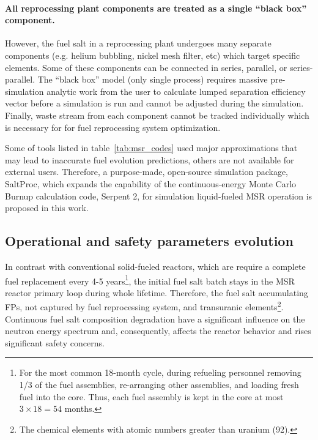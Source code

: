 \paragraph{All reprocessing plant components are treated as a single ``black 
box'' component.} However, the fuel salt in a reprocessing plant undergoes 
many separate components (e.g. helium bubbling, nickel mesh filter, etc) which 
target specific elements. Some of these components can be connected in series, 
parallel, or series-parallel. The ``black box'' model (only single process) 
requires massive pre-simulation analytic work from the user to calculate 
lumped separation efficiency vector before a simulation is run and cannot be 
adjusted during the simulation.	Finally, waste stream from each component 
cannot be tracked individually which is necessary for for fuel reprocessing 
system optimization.

Some of tools listed in table~\ref{tab:msr_codes} used major approximations 
that may lead to inaccurate fuel evolution predictions, others are not 
available for external users. Therefore, a purpose-made, open-source 
simulation package, SaltProc, which expands the capability of the 
continuous-energy Monte Carlo 
Burnup calculation code, Serpent 2, for simulation liquid-fueled \gls{MSR} 
operation is proposed in this work.

\subsection{Operational and safety parameters evolution}
In contrast with conventional solid-fueled reactors, which are require a 
complete fuel replacement every 4-5 years\footnote{For the most common 
18-month cycle, 
during refueling personnel removing 1/3 of the fuel assemblies, re-arranging 
other assemblies, and loading fresh fuel into the core. Thus, each fuel 
assembly is kept in the core at most $3\times 18=54$ months.}, the initial 
fuel salt batch stays in the \gls{MSR} reactor primary loop during whole 
lifetime. Therefore, the fuel salt accumulating \glspl{FP}, not captured 
by fuel  reprocessing system, and transuranic elements\footnote{The chemical 
elements with atomic numbers greater than uranium (92).}. 
Continuous fuel salt composition degradation have a significant influence on 
the neutron energy spectrum and, consequently, affects the reactor behavior 
and rises significant safety concerns.

